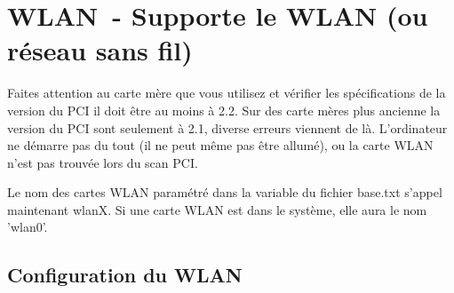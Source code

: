 
{
\section {WLAN~- Supporte le WLAN (ou réseau sans fil)}
}

Faites attention au carte mère que vous utilisez et vérifier les spécifications
de la version du PCI il doit être au moins à 2.2. Sur des carte mères plus
ancienne la version du PCI sont seulement à 2.1, diverse erreurs viennent de là.
L'ordinateur ne démarre pas du tout (il ne peut même pas être allumé), ou la
carte WLAN n'est pas trouvée lors du scan PCI.

Le nom des cartes WLAN paramétré dans la variable  du fichier
base.txt s'appel maintenant wlanX. Si une carte WLAN est dans le système, elle
aura le nom 'wlan0'. 


\subsection{Configuration du WLAN}

